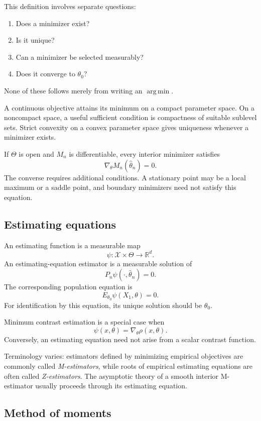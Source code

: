 This definition involves separate questions:
\begin{enumerate}
\item Does a minimizer exist?
\item Is it unique?
\item Can a minimizer be selected measurably?
\item Does it converge to $\theta_0$?
\end{enumerate}
None of these follows merely from writing an $\operatorname{arg\,min}$.

A continuous objective attains its minimum on a compact parameter
space. On a noncompact space, a useful sufficient condition is
compactness of suitable sublevel sets. Strict convexity on a convex
parameter space gives uniqueness whenever a minimizer exists.

If $\Theta$ is open and $M_n$ is differentiable, every interior
minimizer satisfies
\[
\nabla_\theta M_n(\widehat\theta_n)=0.
\]
The converse requires additional conditions. A stationary point may
be a local maximum or a saddle point, and boundary minimizers need
not satisfy this equation.

\subsection{Estimating equations}

An estimating function is a measurable map
\[
\psi:\mathcal X\times\Theta\longrightarrow\mathbb R^d.
\]
An estimating-equation estimator is a measurable solution of
\[
P_n\psi(\cdot,\widehat\theta_n)=0.
\]
The corresponding population equation is
\[
E_{\theta_0}\psi(X_1,\theta)=0.
\]
For identification by this equation, its unique solution should be
$\theta_0$.

Minimum contrast estimation is a special case when
\[
\psi(x,\theta)=\nabla_\theta\rho(x,\theta).
\]
Conversely, an estimating equation need not arise from a scalar
contrast function.

Terminology varies: estimators defined by minimizing empirical
objectives are commonly called \emph{M-estimators}, while roots of
empirical estimating equations are often called \emph{Z-estimators}.
The asymptotic theory of a smooth interior M-estimator usually
proceeds through its estimating equation.

\subsection{Method of moments}

